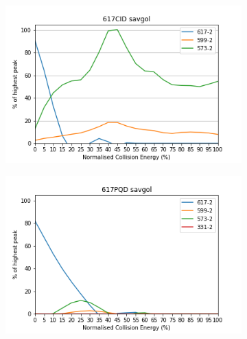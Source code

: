 \begin{figure}[!htbp]
  \begin{subfigure}[b]{0.5\textwidth}
    \includegraphics[width=\textwidth]{content/Anhang/ESIMS/Bo-DYCC/617CID-617-2savgol.png}
    \caption{}
  \end{subfigure}
  \hfill
  \begin{subfigure}[b]{0.5\textwidth}
    \includegraphics[width=\textwidth]{content/Anhang/ESIMS/Bo-DYCC/617PQD-617-2savgol.png}
    \caption{}
  \end{subfigure}
  

\end{figure}
